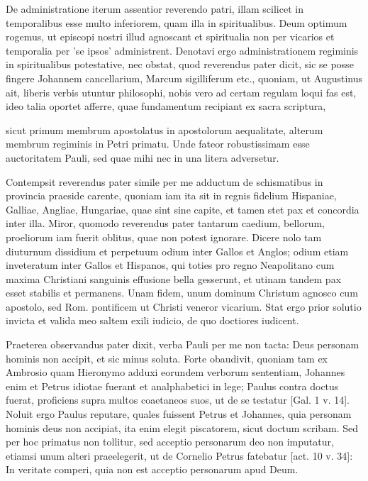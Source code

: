 De administratione iterum assentior reverendo patri, illam scilicet in temporalibus esse multo inferiorem, quam illa in spiritualibus. Deum optimum rogemus, ut episcopi nostri illud agnoscant et spiritualia non per vicarios et temporalia per 'se ipsos' administrent. Denotavi ergo administrationem regiminis in spiritualibus potestative, nec obstat, quod reverendus pater dicit, sic se posse fingere Johannem cancellarium, Marcum sigilliferum etc., quoniam, ut Augustinus ait, liberis verbis utuntur philosophi, nobis vero ad certam regulam loqui fas est, ideo talia oportet afferre, quae fundamentum recipiant ex sacra scriptura,

sicut primum membrum apostolatus in apostolorum aequalitate, alterum membrum regiminis in Petri primatu. Unde fateor robustissimam esse auctoritatem Pauli, sed quae mihi nec in una litera adversetur.

Contempsit reverendus pater simile per me adductum de schismatibus in provincia praeside carente, quoniam iam ita sit in regnis fidelium Hispaniae, Galliae, Angliae, Hungariae, quae sint sine capite, et tamen stet pax et concordia inter illa. Miror, quomodo reverendus pater tantarum caedium, bellorum, proeliorum iam fuerit oblitus, quae non potest ignorare. Dicere nolo tam diuturnum dissidium et perpetuum odium inter Gallos et Anglos; odium etiam inveteratum inter Gallos et Hispanos, qui toties pro regno Neapolitano cum maxima Christiani sanguinis effusione bella gesserunt, et utinam tandem pax esset stabilis et permanens. Unam fidem, unum dominum Christum agnosco cum apostolo, sed Rom. pontificem ut Christi veneror vicarium. Stat ergo prior solutio invicta et valida meo saltem exili iudicio, de quo doctiores iudicent.

Praeterea observandus pater dixit, verba Pauli per me non tacta: Deus personam hominis non accipit, et sic minus soluta. Forte obaudivit, quoniam tam ex Ambrosio quam Hieronymo adduxi eorundem verborum sententiam, Johannes enim et Petrus idiotae fuerant et analphabetici in lege; Paulus contra doctus fuerat, proficiens supra multos coaetaneos suos, ut de se testatur [Gal. 1 v. 14]. Noluit ergo Paulus reputare, quales fuissent Petrus et Johannes, quia personam hominis deus non accipiat, ita enim elegit piscatorem, sicut doctum scribam. Sed per hoc primatus non tollitur, sed acceptio personarum deo non imputatur, etiamsi unum alteri praeelegerit, ut de Cornelio Petrus fatebatur [act. 10 v. 34]: In veritate comperi, quia non est acceptio personarum apud Deum.

